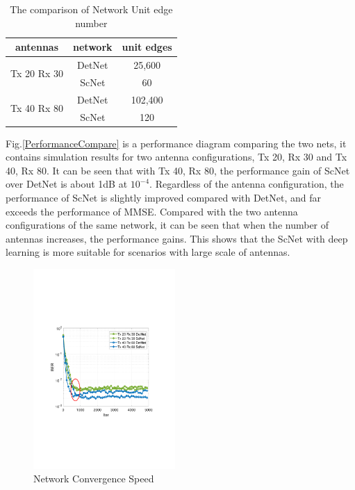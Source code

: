 \documentclass[conference]{IEEEtran}
\begin{document}
\begin{table}[!htbp]
\centering
\caption{The comparison of Network Unit edge number}
\begin{tabular}{|c|c|c|} %
\hline
antennas&network&unit edges \\
\hline
\multirow{2}{*}{Tx 20 Rx 30} & DetNet & 25,600 \\
\cline{2-3} &ScNet & 60 \\
\hline
\multirow{2}{*}{Tx 40 Rx 80} & DetNet & 102,400 \\
\cline{2-3} &ScNet & 120 \\
\hline
\end{tabular}
\label{edgesCompare}
\end{table}

Fig.\ref{PerformanceCompare} is a performance diagram comparing the two nets, it contains simulation results for two antenna configurations, Tx 20, Rx 30 and Tx 40, Rx 80. It can be seen that with Tx 40, Rx 80, the performance gain of ScNet over DetNet is about 1dB at ${10^{-4}}$.  Regardless of the antenna configuration, the performance of ScNet is slightly improved compared with DetNet, and far exceeds the performance of MMSE. Compared with the two antenna configurations of the same network, it can be seen that when the number of antennas increases, the performance gains. This shows that the ScNet with deep learning is more suitable for scenarios with large scale of antennas.

\begin{figure}[ht]
  \centering
  \includegraphics[width=0.48\textwidth]{convergence.pdf}
  \caption{Network Convergence Speed}
  \label{Convergence}
\end{figure}
\end{document}
